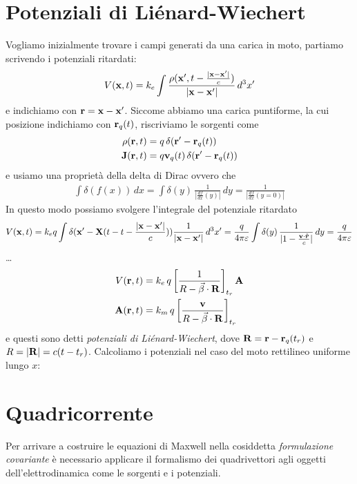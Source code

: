 \section{Potenziali di Liénard-Wiechert}
Vogliamo inizialmente trovare i campi generati da una carica in moto, partiamo scrivendo i potenziali ritardati:
\begin{align}
  V(\mathbf{ x },t) = k_e \int \frac{\rho(\mathbf{ x }', t - \frac{|\mathbf{ x-x' }|}{c})}{|\mathbf{ x-x' }|}\,d^3x'
\end{align}
e indichiamo con $ \mathbf{ r } = \mathbf{ x - x' } $. Siccome abbiamo una carica puntiforme, la cui posizione indichiamo con $ \mathbf{r}_q(t) $, riscriviamo le 
sorgenti come
\begin{align}
  \rho(\mathbf{r}, t) &= q \, \delta(\mathbf{ r' } - \mathbf{ r }_q(t))
  \\
  \mathbf{J}(\mathbf{r}, t) &= q \mathbf{v}_q(t) \, \delta(\mathbf{ r' } - \mathbf{ r }_q(t))
\end{align}
e usiamo una proprietà della delta di Dirac ovvero che
\begin{align}
  \int \delta(f(x)) \,dx = \int \delta(y) \, \frac{1}{|\frac{df}{dx}(y)|} \,dy = \frac{1}{|\frac{df}{dx}(y = 0)|}
\end{align}
In questo modo possiamo svolgere l'integrale del potenziale ritardato
\begin{align}
  V(\mathbf{ x },t) = k_e q \int \delta(\mathbf{ x' } - \mathbf{ X }(t - t - \frac{|\mathbf{ x-x' }|}{c})) \frac{1}{|\mathbf{ x-x' }|} \,d^3x'
  = \frac{q}{4\pi\varepsilon} \int \delta(y) \, \frac{1}{|1 - \frac{\mathbf{ v }\cdot \hat{\boldsymbol{r}} }{c}|} \,dy = \frac{q}{4\pi\varepsilon} 
\end{align}
\dots
\begin{align}
  V(\mathbf{r},t) &= k_e \, q \left[ \frac{1}{R - \vec{\beta} \cdot \mathbf{R}} \right]_{t_r} \mathbf{A}
  \\
  \mathbf{A}(\mathbf{r},t) &= k_m \, q \left[ \frac{\mathbf{v}}{R - \vec{\beta} \cdot \mathbf{R}} \right]_{t_r}
\end{align}
e questi sono detti \textit{potenziali di Liénard-Wiechert}, dove $ \mathbf{R} = \mathbf{r} - \mathbf{r}_q(t_r)$ e $ R = |\mathbf{R}| = c (t - t_r) $. 
Calcoliamo i potenziali nel caso del moto rettilineo uniforme lungo $ x $:

\section{Quadricorrente}
Per arrivare a costruire le equazioni di Maxwell nella cosiddetta \textit{formulazione covariante} è necessario applicare il formalismo dei quadrivettori 
agli oggetti dell'elettrodinamica come le sorgenti e i potenziali.

